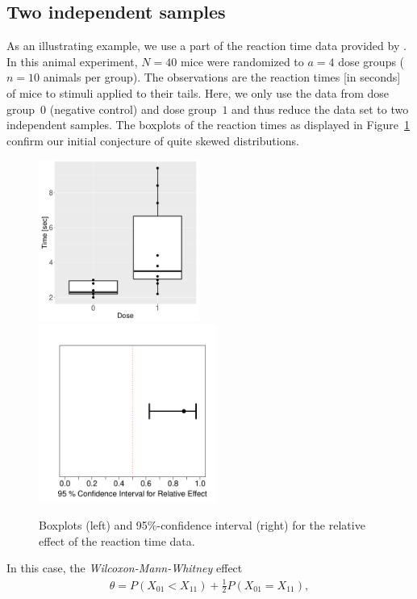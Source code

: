 \subsection{Two independent samples}

As an illustrating example, we use a part of the reaction time data provided by 
\cite{shirley1977non}. In this animal experiment, $N=40$ mice 
were randomized to $a=4$ dose groups ($n=10$ animals per group). The 
observations are the reaction times [in seconds] of mice to stimuli applied to 
their tails. Here, we only use the data from dose group~$0$ (negative control) 
and dose group~$1$ and thus reduce the data set to two independent samples. The 
boxplots of the reaction times as displayed in Figure~\ref{fig:reaction} 
confirm our initial conjecture of quite skewed distributions. 
\begin{figure}[t!]
\centering
\includegraphics[width=0.47\textwidth]{boxplot_reaction}
\includegraphics[width=0.52\textwidth]{CI_reaction}
\caption{\label{fig:reaction} Boxplots (left) and 95\%-confidence interval (right) for the relative effect of the reaction time data.}
\end{figure}
In this case, the \emph{Wilcoxon-Mann-Whitney} effect 
\begin{eqnarray*}
\theta=P(X_{01}< X_{11}) +\tfrac12 P(X_{01}=X_{11}),
\end{eqnarray*}
